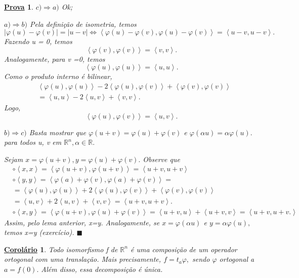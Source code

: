 \documentclass{article}
\newtheorem*{crl*}{\underline{Corol\'ario}}
\newtheorem*{proof*}{\underline{Prova}}
\renewcommand\qedsymbol{$\blacksquare$}
\begin{document}
\begin{proof*}
  $c)\Rightarrow a)$ Ok;

  $a)\Rightarrow b)$ Pela defini\c c\~ao de isometria, temos 
    $$
      |\varphi (u)-\varphi (v)| = |u-v| \Longleftrightarrow \left< \varphi (u)-\varphi (v), \varphi (u)-\varphi (v) \right> = 
      \left< u-v, u-v \right>.
    $$
  Fazendo u = 0, temos 
  $$
    \left< \varphi (v), \varphi (v) \right> = \left< v, v \right>.
  $$
  Analogamente, para v =0, temos 
    $$
      \left< \varphi (u), \varphi (u) \right> = \left< u, u \right>.
    $$
  Como o produto interno \'e bilinear, 
    \begin{align*} 
      &\left< \varphi (u), \varphi (u) \right> - 2\left< \varphi (u), \varphi (v) \right> + \left< \varphi (v), \varphi (v) \right>\\
      &=\left< u, u \right> - 2\left< u, v \right> + \left< v, v \right>.
    \end{align*}
    Logo, 
      $$
        \left< \varphi (u), \varphi (v) \right> = \left< u, v \right>.
      $$

    $b)\Rightarrow c)$ Basta mostrar que $\varphi (u+v)=\varphi (u)+\varphi (v)$ e $\varphi (\alpha u) = \alpha \varphi (u).$
    para todos u, v em $\mathbb{R}^{n}, \alpha \in \mathbb{R}.$ 

    Sejam $x=\varphi (u+v), y=\varphi (u)+\varphi (v).$ Observe que 
   \begin{align*}
     &\circ{}\left< x, x \right>=\left< \varphi (u+v), \varphi (u+v) \right> = \left< u+v, u+v \right>\\
     &\circ{}\left< y, y \right> = \left< \varphi (a)+\varphi (v), \varphi (a)+\varphi (v) \right> =\\
     &=\left< \varphi (u), \varphi (u) \right> + 2\left< \varphi (u),\varphi (v) \right> + \left< \varphi (v), \varphi (v) \right>\\
     &=\left< u, v \right> +2\left< u, v \right> + \left< v, v \right> = \left< u+v, u+v \right>.\\
     &\circ{}\left< x, y \right>=\left< \varphi (u+v), \varphi (u)+\varphi (v) \right>=\left< u+v, u \right>+\left< u+v, v \right>=\left< u+v, u+v. \right>
   \end{align*}
    Assim, pelo lema anterior, x=y. Analogamente, se $x=\varphi (\alpha u)$ e $y=\alpha \varphi (u),$ temos x=y (exerc\'icio). \qedsymbol
\end{proof*}
 \begin{crl*}
   Todo isomorfismo f de $\mathbb{R}^{n}$ \'e uma composi\c c\~ao de um operador ortogonal com uma transla\c c\~ao. Mais precisamente,
   $f=t_{a}\varphi,$ sendo $\varphi $ ortogonal a $a=f(0).$ Al\'em disso, essa decomposi\c c\~ao \'e \'unica.
 \end{crl*}
\end{document}
